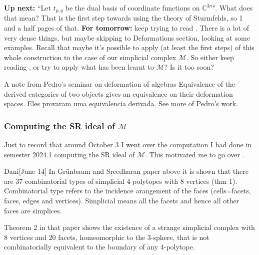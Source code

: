 \textbf{Up next:} ``Let \(t_{p,q}\) be the dual basis of coordinate functions on \(\mathbb{C}^{3n}\)". {\color{4}What does that mean?} That is the first step towards using the theory of Sturmfelds, so 1 and a half pages of that. \textbf{For tomorrow:} keep trying to read \cite{jan1}. There is a lot of very dense things, but maybe skipping to Deformations section, looking at some examples. Recall that maybe it's possible to apply (at least the first steps) of this whole construction to the case of our simplicial complex \(\mathcal{M}\). So either keep reading \cite{jan1}, or try to apply what has been learnt to \(\mathcal{M}\)? Is it too soon?

\begin{thing2}{A note from Pedro's seminar on deformation of algebras}\leavevmode
Equivalence of the derived categories of two objects gives an equivalence on their deformation spaces. Eles provaram uma equivalencia derivada. See \cite{pedro} more of Pedro's work.
\end{thing2}

\subsubsection{Computing the SR ideal of $\mathcal{M}$}

{\color{2}Just to record that around October 3 I went over the computation I had done in semester 2024.1 computing the SR ideal of $\mathcal{M}$. This motivated me to go over \cite{jan2}.} 

\begin{thing9}{Dani}[June 14]\leavevmode
	In Grünbaum and Sreedharan paper above it is shown that there are 37 combinatorial types of simplicial 4-polytopes with 8 vertices (thm 1). Combinatorial type refers to the incidence arangement of the faces (cells=facets, faces, edges and vertices). Simplicial means all the facets and hence all other faces are simplices.

	Theorem 2 in that paper shows the existence of a strange simplicial complex with 8 vertices and 20 facets, homeomorphic to the 3-sphere, that is not combinatorially equivalent to the boundary of any 4-polytope.
\end{thing9}

